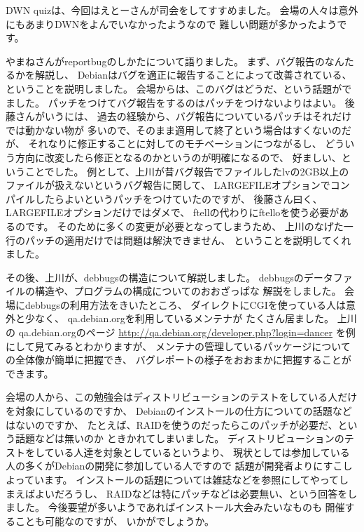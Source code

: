 \documentclass[mingoth,a4paper]{jsarticle}
\begin{document}
	    DWN quizは、今回はえとーさんが司会をしてすすめました。
	    会場の人々は意外にもあまりDWNをよんでいなかったようなので
	    難しい問題が多かったようです。

	    やまねさんがreportbugのしかたについて語りました。
	    まず、バグ報告のなんたるかを解説し、
	    Debianはバグを適正に報告することによって改善されている、ということを説明しました。
	    会場からは、このバグはどうだ、という話題がでました。
	    パッチをつけてバグ報告をするのはパッチをつけないよりはよい。
	    後藤さんがいうには、
	    過去の経験から、バグ報告についているパッチはそれだけでは動かない物が
	    多いので、そのまま適用して終了という場合はすくないのだが、
	    それなりに修正することに対してのモチベーションにつながるし、
	    どういう方向に改変したら修正となるのかというのが明確になるので、
	    好ましい、ということでした。
	    例として、上川が昔バグ報告でファイルしたlvの2GB以上のファイルが扱えないというバグ報告に関して、
	    LARGEFILEオプションでコンパイルしたらよいというパッチをつけていたのですが、
	    後藤さん曰く、LARGEFILEオプションだけではダメで、
	    ftellの代わりにftelloを使う必要があるのです。
	    そのために多くの変更が必要となってしまうため、
	    上川のなげた一行のパッチの適用だけでは問題は解決できません、
	    ということを説明してくれました。

	    その後、上川が、debbugsの構造について解説しました。
	    debbugsのデータファイルの構造や、プログラムの構成についてのおおざっぱな
	    解説をしました。
	    会場にdebbugsの利用方法をきいたところ、
	    ダイレクトにCGIを使っている人は意外と少なく、
	    qa.debian.orgを利用しているメンテナが
	    たくさん居ました。
	    上川の
	      qa.debian.orgのページ
	    \url{http://qa.debian.org/developer.php?login=dancer} 
	    を例にして見てみるとわかりますが、
	    メンテナの管理しているパッケージについての全体像が簡単に把握でき、
	    バグレポートの様子をおおまかに把握することができます。

	    会場の人から、この勉強会はディストリビューションのテストをしている人だけを対象にしているのですか、
	    Debianのインストールの仕方についての話題などはないのですか、
	    たとえば、RAIDを使うのだったらこのパッチが必要だ、という話題などは無いのか
	    ときかれてしまいました。
	    ディストリビューションのテストをしている人達を対象としているというより、
	    現状としては参加している人の多くがDebianの開発に参加している人ですので
	    話題が開発者よりにすこしよっています。
	    インストールの話題については雑誌などを参照にしてやってしまえばよいだろうし、
	    RAIDなどは特にパッチなどは必要無い、という回答をしました。
	    今後要望が多いようであればインストール大会みたいなものも
	    開催することも可能なのですが、
	    いかがでしょうか。
\end{document}
